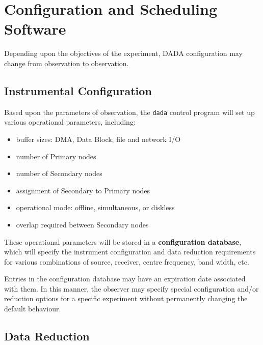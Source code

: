 \chapter{Configuration and Scheduling Software}

Depending upon the objectives of the experiment, DADA configuration
may change from observation to observation.

\section{Instrumental Configuration}

Based upon the parameters of observation, the {\tt dada} control
program will set up various operational parameters, including:
\begin{itemize}
\item buffer sizes: DMA, Data Block, file and network I/O
\item number of Primary nodes
\item number of Secondary nodes
\item assignment of Secondary to Primary nodes
\item operational mode: offline, simultaneous, or diskless
\item overlap required between Secondary nodes
\end{itemize}
These operational parameters will be stored in a {\bf configuration
database}, which will specify the instrument configuration and data
reduction requirements for various combinations of source, receiver,
centre frequency, band width, etc.

Entries in the configuration database may have an expiration date
associated with them.  In this manner, the observer may specify
special configuration and/or reduction options for a specific
experiment without permanently changing the default behaviour.

\section{Data Reduction}

